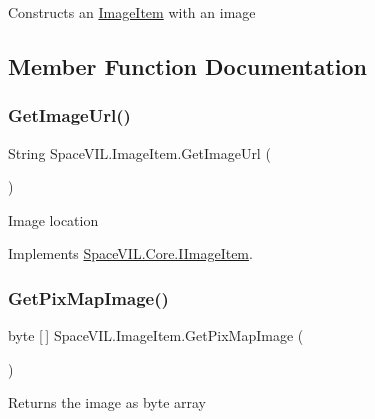 Constructs an \mbox{\hyperlink{class_space_v_i_l_1_1_image_item}{Image\+Item}} with an image 



\subsection{Member Function Documentation}
\mbox{\label{class_space_v_i_l_1_1_image_item_a9da0616d71482cc74d16e83ea00913af}} 
\subsubsection{\texorpdfstring{Get\+Image\+Url()}{GetImageUrl()}}
{\footnotesize\ttfamily String Space\+V\+I\+L.\+Image\+Item.\+Get\+Image\+Url (\begin{DoxyParamCaption}{ }\end{DoxyParamCaption})}



Image location 



Implements \mbox{\hyperlink{interface_space_v_i_l_1_1_core_1_1_i_image_item}{Space\+V\+I\+L.\+Core.\+I\+Image\+Item}}.

\mbox{\label{class_space_v_i_l_1_1_image_item_a85be98b3558beec30a134e2da5304fd5}} 
\subsubsection{\texorpdfstring{Get\+Pix\+Map\+Image()}{GetPixMapImage()}}
{\footnotesize\ttfamily byte \mbox{[}$\,$\mbox{]} Space\+V\+I\+L.\+Image\+Item.\+Get\+Pix\+Map\+Image (\begin{DoxyParamCaption}{ }\end{DoxyParamCaption})}



Returns the image as byte array 



